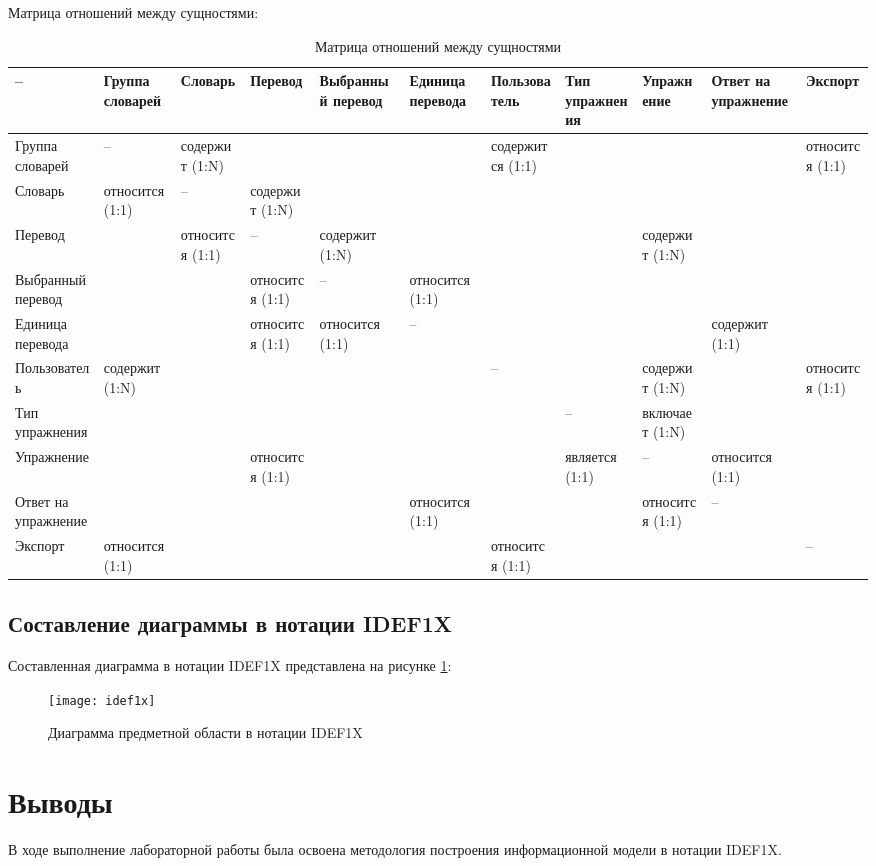 \documentclass[a4paper,14pt]{extarticle}
\begin{document}
Матрица отношений между сущностями:

\begin{landscape}
\begin{table}[H]
    \footnotesize
    \caption{Матрица отношений между сущностями}
    \begin{tabular}{ | p{1.9cm} | p{1.9cm} | p{1.9cm} | p{1.9cm} | p{1.9cm} | p{1.9cm} | p{1.9cm} | p{1.9cm} | p{1.9cm} | p{1.9cm} | p{1.9cm} | }
        \hline
        -- & Группа словарей & Словарь & Перевод & Выбранный перевод & Единица перевода  & Пользователь & Тип упражнения & Упражнение & Ответ на упражнение & Экспорт \\ \hline
        Группа словарей & -- & содержит (1:N) & & & & содержится (1:1) & & & & относится (1:1) \\ \hline
        Словарь & относится (1:1) & -- & содержит (1:N) & & & & & & & \\ \hline
        Перевод & & относится (1:1) & -- & содержит (1:N) & & & & содержит (1:N) & & \\ \hline
        Выбранный перевод & & & относится (1:1) & -- & относится (1:1) & & & & & \\ \hline
        Единица перевода & & & относится (1:1) & относится (1:1) & -- & & & & содержит (1:1) & \\ \hline
        Пользователь & содержит (1:N) & & & & & -- & & содержит (1:N) & & относится (1:1) \\ \hline
        Тип упражнения & & & & & & & -- & включает (1:N) & & \\ \hline
        Упражнение & & & относится (1:1) & & & & является (1:1) & -- & относится (1:1) & \\ \hline
        Ответ на упражнение & & & & & относится (1:1) & & & относится (1:1) & -- & \\ \hline
        Экспорт & относится (1:1) & & & & & относится (1:1) & & & & -- \\ \hline
    \end{tabular}
\end{table}
\pagebreak
\end{landscape}

\subsection{Составление диаграммы в нотации IDEF1X}
Составленная диаграмма в нотации IDEF1X представлена на рисунке
\ref{fig:idef1x}:

\begin{figure}[H]
    \centering
    \texttt{[image: idef1x]}
    \caption{Диаграмма предметной области в нотации IDEF1X}
    \label{fig:idef1x}
\end{figure}

\section*{Выводы}
В ходе выполнение лабораторной работы была освоена методология построения
информационной модели в нотации IDEF1X.
\end{document}
